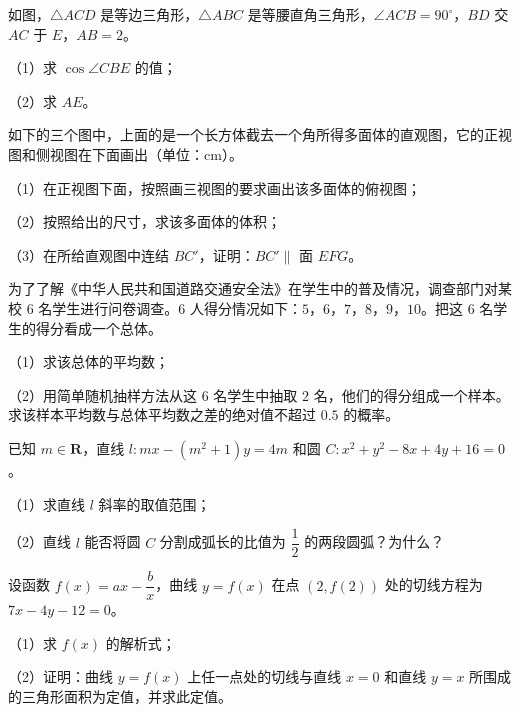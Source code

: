 \Needspace{0.4\textheight}
\begin{question}
如图，$\triangle ACD$ 是等边三角形，$\triangle ABC$ 是等腰直角三角形，$\angle ACB=90^\circ$，$BD$ 交 $AC$ 于 $E$，$AB=2$。

（1）求 $\cos\angle CBE$ 的值；

（2）求 $AE$。
\nopagebreak[4]
\begin{center}\end{center}
\nopagebreak[4]
\Needspace{0.4\textheight}
\end{question}
\begin{question}
如下的三个图中，上面的是一个长方体截去一个角所得多面体的直观图，它的正视图和侧视图在下面画出（单位：cm）。

（1）在正视图下面，按照画三视图的要求画出该多面体的俯视图；

（2）按照给出的尺寸，求该多面体的体积；

（3）在所给直观图中连结 $BC'$，证明：$BC'\parallel$ 面 $EFG$。
\nopagebreak[4]
\begin{center}\end{center}
\nopagebreak[4]
\end{question}
\begin{question}
为了了解《中华人民共和国道路交通安全法》在学生中的普及情况，调查部门对某校 $6$ 名学生进行问卷调查。$6$ 人得分情况如下：$5$，$6$，$7$，$8$，$9$，$10$。把这 $6$ 名学生的得分看成一个总体。

（1）求该总体的平均数；

（2）用简单随机抽样方法从这 $6$ 名学生中抽取 $2$ 名，他们的得分组成一个样本。求该样本平均数与总体平均数之差的绝对值不超过 $0.5$ 的概率。

\end{question}
\begin{question}
已知 $m\in\mathbf R$，直线 $l:mx-(m^2+1)y=4m$ 和圆 $C:x^2+y^2-8x+4y+16=0$。

（1）求直线 $l$ 斜率的取值范围；

（2）直线 $l$ 能否将圆 $C$ 分割成弧长的比值为 $\dfrac12$ 的两段圆弧？为什么？

\end{question}
\begin{question}
设函数 $f(x)=ax-\dfrac bx$，曲线 $y=f(x)$ 在点 $(2,f(2))$ 处的切线方程为 $7x-4y-12=0$。

（1）求 $f(x)$ 的解析式；

（2）证明：曲线 $y=f(x)$ 上任一点处的切线与直线 $x=0$ 和直线 $y=x$ 所围成的三角形面积为定值，并求此定值。

\end{question}

